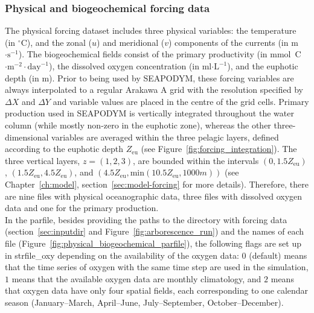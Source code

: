 \subsubsection{Physical and biogeochemical forcing data}
\label{sec:phys-biog-data}
\vspace*{-0.1cm}

The physical forcing dataset includes three physical variables: the temperature (in $^{\circ}$C), and the zonal ($u$) and meridional ($v$) components of the currents (in m$\cdot\text{s}^{-1}$). The biogeochemical fields consist of the primary productivity (in mmol~C$\cdot\text{m}^{-2} \cdot\text{day}^{-1}$), the dissolved oxygen concentration (in ml$\cdot\text{L}^{-1}$), and the euphotic depth (in m).
Prior to being used by SEAPODYM, these forcing variables are always interpolated to a regular Arakawa A grid with the resolution specified by $\Delta X$ and $\Delta Y$ and variable values are placed in the centre of the grid cells. Primary production used in SEAPODYM is vertically integrated throughout the water column (while mostly non-zero in the euphotic zone), whereas the other three-dimensional variables are averaged within the three pelagic layers, defined according to the euphotic depth $Z_{\text{eu}}$ (see Figure~\ref{fig:forcing_integration}). The three vertical layers, $z=(1,2,3)$, are bounded within the intervals $(0, 1.5Z_{\text{eu}})$, $(1.5Z_{\text{eu}}, 4.5Z_{\text{eu}})$, and $(4.5Z_{\text{eu}}, \text{min}(10.5Z_{\text{eu}}, 1000m))$ (see Chapter~\ref{ch:model}, section~\ref{sec:model-forcing} for more details). Therefore, there are nine files with physical oceanographic data, three files with dissolved oxygen data and one for the primary production. \\

In the parfile, besides providing the paths to the directory with forcing data (section~\ref{sec:inputdir} and Figure~\ref{fig:arborescence_run}) and the names of each file (Figure~\ref{fig:physical_biogeochemical_parfile}), the following flags are set up in  {\ttfamily strfile\_oxy} depending on the availability of the oxygen data: $0$ (default) means that the time series of oxygen with the same time step are used in the simulation, $1$ means that the available oxygen data are monthly climatology, and $2$ means that oxygen data have only four spatial fields, each corresponding to one calendar season (January--March, April--June, July--September, October--December).\\

